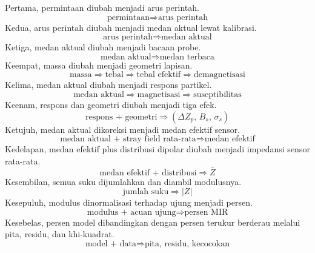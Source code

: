 \documentclass[a4paper,11pt]{article}
\begin{document}
Pertama, permintaan diubah menjadi arus perintah.
\begin{equation*}
\text{permintaan} \Rightarrow \text{arus perintah}
\end{equation*}
Kedua, arus perintah diubah menjadi medan aktual lewat kalibrasi.
\begin{equation*}
\text{arus perintah} \Rightarrow \text{medan aktual}
\end{equation*}
Ketiga, medan aktual diubah menjadi bacaan probe.
\begin{equation*}
\text{medan aktual} \Rightarrow \text{medan terbaca}
\end{equation*}
Keempat, massa diubah menjadi geometri lapisan.
\begin{equation*}
\text{massa} \Rightarrow \text{tebal} \Rightarrow \text{tebal efektif}
\Rightarrow \text{demagnetisasi}
\end{equation*}
Kelima, medan aktual diubah menjadi respons partikel.
\begin{equation*}
\text{medan aktual} \Rightarrow \text{magnetisasi}
\Rightarrow \text{suseptibilitas}
\end{equation*}
Keenam, respons dan geometri diubah menjadi tiga efek.
\begin{equation*}
\text{respons + geometri} \Rightarrow
(\Delta Z_{p},\,B_{s},\,\sigma_{s})
\end{equation*}
Ketujuh, medan aktual dikoreksi menjadi medan efektif sensor.
\begin{equation*}
\text{medan aktual + stray field rata-rata} \Rightarrow \text{medan efektif}
\end{equation*}
Kedelapan, medan efektif plus distribusi dipolar diubah menjadi
impedansi sensor rata-rata.
\begin{equation*}
\text{medan efektif + distribusi} \Rightarrow \bar Z
\end{equation*}
Kesembilan, semua suku dijumlahkan dan diambil modulusnya.
\begin{equation*}
\text{jumlah suku} \Rightarrow |Z|
\end{equation*}
Kesepuluh, modulus dinormalisasi terhadap ujung menjadi persen.
\begin{equation*}
\text{modulus + acuan ujung} \Rightarrow \text{persen MIR}
\end{equation*}
Kesebelas, persen model dibandingkan dengan persen terukur berderau
melalui pita, residu, dan khi-kuadrat.
\begin{equation*}
\text{model + data} \Rightarrow \text{pita, residu, kecocokan}
\end{equation*}
\end{document}
